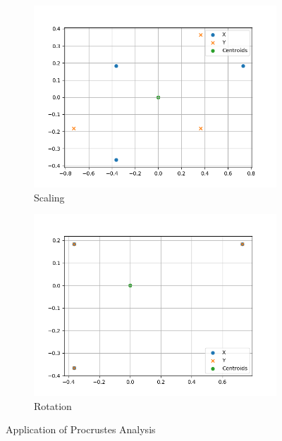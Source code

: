 \begin{figure}[h]
\begin{subfigure}[b]{0.475\textwidth}
        \centering 
        \includegraphics[width=\textwidth]{figures/procrustes_ex3}
        \caption[]
        {{\small Scaling}}    
        \label{fig:procrustes_ex_3}
    \end{subfigure}
    \begin{subfigure}[b]{0.475\textwidth}   
        \centering 
        \includegraphics[width=\textwidth]{figures/procrustes_ex4}
        \caption[]
        {{\small Rotation}}    
        \label{fig:procrustes_ex_4}
    \end{subfigure}
    \caption[]
    {Application of Procrustes Analysis} 
    \label{fig:procrustes_analysis}
\end{figure}

